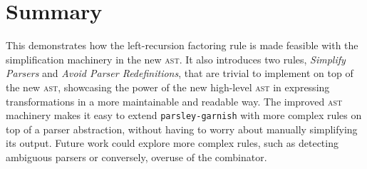 \documentclass[../../main.tex]{subfiles}
\begin{document}
\section*{Summary}
This  demonstrates how the left-recursion factoring rule is made feasible with the simplification machinery in the new  \textsc{ast}.
It also introduces two rules, \emph{Simplify Parsers} and \emph{Avoid Parser Redefinitions}, that are trivial to implement on top of the new  \textsc{ast}, showcasing the power of the new high-level \textsc{ast} in expressing transformations in a more maintainable and readable way.
The improved  \textsc{ast} machinery makes it easy to extend \texttt{parsley-garnish} with more complex rules on top of a parser abstraction, without having to worry about manually simplifying its output.
Future work could explore more complex rules, such as detecting ambiguous parsers or conversely, overuse of the  combinator.
\end{document}

